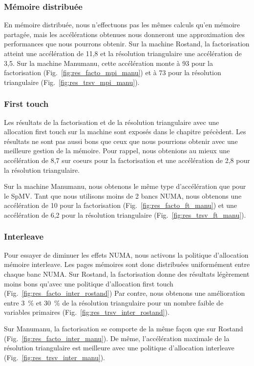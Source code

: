 \subsubsection{Mémoire distribuée}
En mémoire distribuée, nous n'effectuons pas les mêmes calculs qu'en mémoire partagée, mais les accélérations obtenues nous donneront une approximation des performances que nous pourrons obtenir.
%
Sur la machine Rostand, la factorisation atteint une accélération de 11,8 et la résolution triangulaire une accélération de 3,5.
%
Sur la machine Manumanu, cette accélération monte à 93 pour la factorisation (Fig.~\ref{fig:res_facto_mpi_manu}) et à 73 pour la résolution triangulaire (Fig.~\ref{fig:res_trsv_mpi_manu}).

\subsubsection{First touch}
Les résultats de la factorisation et de la résolution triangulaire avec une allocation first touch sur la machine  sont exposés dans le chapitre précèdent.
%
Les résultats ne sont pas aussi bons que ceux que nous pourrions obtenir avec une meilleure gestion de la mémoire.
%
Pour rappel, nous obtenions au mieux une accélération de 8,7 sur coeurs pour la factorisation et une accélération de 2,8 pour la résolution triangulaire.

Sur la machine Manumanu, nous obtenons le même type d'accélération que pour le SpMV.
%
Tant que nous utilisons moins de 2 bancs NUMA, nous obtenons une accélération de 10 pour la factorisation (Fig.~\ref{fig:res_facto_ft_manu}) et une accélération de 6,2 pour la résolution triangulaire (Fig.~\ref{fig:res_trsv_ft_manu}).

\subsubsection{Interleave}
Pour essayer de diminuer les effets NUMA, nous activons la politique d'allocation mémoire interleave.
%
Les pages mémoires sont donc distribuées uniformément entre chaque banc NUMA.
%
Sur Rostand, la factorisation donne des résultats légèrement moins bons qu'avec une politique d'allocation first touch (Fig.~\ref{fig:res_facto_inter_rostand})
%
Par contre, nous obtenons une amélioration entre 3~\% et 30~\% de la résolution triangulaire pour un nombre faible de variables primaires (Fig.~\ref{fig:res_trsv_inter_rostand}).

Sur Manumanu, la factorisation se comporte de la même façon que sur Rostand (Fig.~\ref{fig:res_facto_inter_manu}).
%
De même, l'accélération maximale de la résolution triangulaire est meilleure avec une politique d'allocation interleave (Fig.~\ref{fig:res_trsv_inter_manu}).


